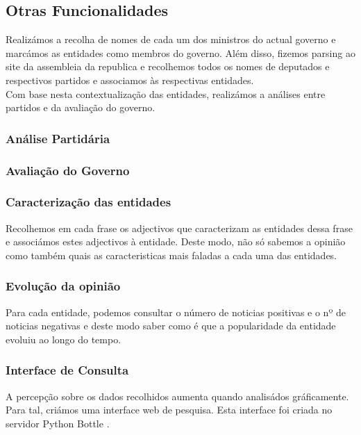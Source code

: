 \subsection{Otras Funcionalidades}%
\hspace{15pt}Realizámos a recolha de nomes de cada um dos ministros do actual governo e marcámos as entidades como membros do governo. Além disso, fizemos parsing ao site da assembleia da republica e recolhemos todos os nomes de deputados e respectivos partidos e associamos às respectivas entidades.\\
Com base nesta contextualização das entidades, realizámos a análises entre partidos e da avaliação do governo.

\subsubsection{Análise Partidária}%

\subsubsection{Avaliação do Governo}%

\subsubsection{Caracterização das entidades}%
\hspace{15pt}Recolhemos em cada frase os adjectivos que caracterizam as entidades dessa frase e associámos estes adjectivos à entidade. Deste modo, não só sabemos a opinião como também quais as caracteristicas mais faladas a cada uma das entidades.

\subsubsection{Evolução da opinião}%
\hspace{15pt}Para cada entidade, podemos consultar o número de noticias positivas e o nº de noticias negativas e deste modo saber como é que a popularidade da entidade evoluiu ao longo do tempo.

\subsubsection{Interface de Consulta}%
\hspace{15pt}A percepção sobre os dados recolhidos aumenta quando analisádos gráficamente. Para tal, criámos uma interface web de pesquisa. Esta interface foi criada no servidor Python Bottle \cite{bottle}.

